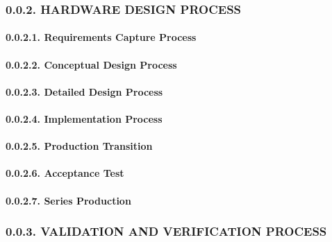 \documentclass[
]{article}
\begin{document}
\hypertarget{hardware-design-process}{%
\subsubsection{0.0.2. HARDWARE DESIGN
PROCESS}\label{hardware-design-process}}

\hypertarget{requirements-capture-process}{%
\paragraph{0.0.2.1. Requirements Capture
Process}\label{requirements-capture-process}}

\hypertarget{conceptual-design-process}{%
\paragraph{0.0.2.2. Conceptual Design
Process}\label{conceptual-design-process}}

\hypertarget{detailed-design-process}{%
\paragraph{0.0.2.3. Detailed Design
Process}\label{detailed-design-process}}

\hypertarget{implementation-process}{%
\paragraph{0.0.2.4. Implementation
Process}\label{implementation-process}}

\hypertarget{production-transition}{%
\paragraph{0.0.2.5. Production Transition}\label{production-transition}}

\hypertarget{acceptance-test}{%
\paragraph{0.0.2.6. Acceptance Test}\label{acceptance-test}}

\hypertarget{series-production}{%
\paragraph{0.0.2.7. Series Production}\label{series-production}}

\hypertarget{validation-and-verification-process}{%
\subsubsection{0.0.3. VALIDATION AND VERIFICATION
PROCESS}\label{validation-and-verification-process}}
\end{document}
